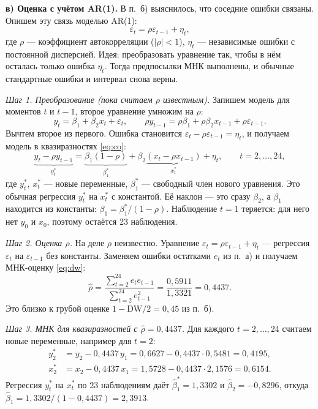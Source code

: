 \begin{solution}
\dwvisual

\medskip
\textbf{в) Оценка с учётом AR(1).} В п.~б) выяснилось, что соседние ошибки
связаны. Опишем эту связь моделью AR(1):
\[
  \varepsilon_t = \rho\varepsilon_{t-1} + \eta_t ,
\]
где $\rho$ — коэффициент автокорреляции ($|\rho| < 1$), $\eta_t$ —
независимые ошибки с постоянной дисперсией. Идея: преобразовать уравнение
так, чтобы в нём осталась только ошибка $\eta_t$. Тогда предпосылки МНК
выполнены, и обычные стандартные ошибки и интервал снова верны.

\smallskip
\emph{Шаг 1. Преобразование (пока считаем $\rho$ известным).} Запишем модель
для моментов $t$ и $t-1$, второе уравнение умножим на $\rho$:
\[
  y_t = \beta_1 + \beta_2x_t + \varepsilon_t ,
  \qquad
  \rho y_{t-1} = \rho\beta_1 + \rho\beta_2x_{t-1} + \rho\varepsilon_{t-1} .
\]
Вычтем второе из первого. Ошибка становится
$\varepsilon_t - \rho\varepsilon_{t-1} = \eta_t$, и получаем модель в
квазиразностях \eqref{eq:co}:
\[
  {\underbrace{y_t - \rho y_{t-1}}_{y_t^*}}
  = {\underbrace{\beta_1(1 - \rho)}_{\beta_1^*}}
  + \beta_2{\underbrace{(x_t - \rho x_{t-1})}_{x_t^*}} + \eta_t,
  \qquad t = 2, \dots, 24 ,
\]
где $y_t^*$, $x_t^*$ — новые переменные, $\beta_1^*$ — свободный член
нового уравнения. Это обычная регрессия $y_t^*$ на $x_t^*$ с константой.
Её наклон — это сразу $\beta_2$, а $\beta_1$ находится из константы:
$\beta_1 = \beta_1^*/(1 - \rho)$. Наблюдение $t = 1$ теряется: для него нет
$y_0$ и $x_0$, поэтому остаётся 23 наблюдения.

\smallskip
\emph{Шаг 2. Оценка $\rho$.} На деле $\rho$ неизвестно. Уравнение
$\varepsilon_t = \rho\varepsilon_{t-1} + \eta_t$ — регрессия $\varepsilon_t$
на $\varepsilon_{t-1}$ без константы. Заменяем ошибки остатками $e_t$ из
п.~а) и получаем МНК-оценку \eqref{eq:dw}:
\[
  \widehat\rho = \frac{\sum_{t=2}^{24} e_te_{t-1}}{\sum_{t=2}^{24} e_{t-1}^2}
  = \frac{0{,}5911}{1{,}3321} = 0{,}4437 .
\]
Это близко к грубой оценке $1 - \mathrm{DW}/2 = 0{,}45$ из п.~б).

\smallskip
\emph{Шаг 3. МНК для квазиразностей с $\widehat\rho = 0{,}4437$.} Для
каждого $t = 2, \dots, 24$ считаем новые переменные, например для $t = 2$:
\begin{align*}
  y_2^* &= y_2 - 0{,}4437\,y_1 = 0{,}6627 - 0{,}4437\cdot 0{,}5481 = 0{,}4195 ,\\
  x_2^* &= x_2 - 0{,}4437\,x_1 = 1{,}5728 - 0{,}4437\cdot 2{,}1576 = 0{,}6154 .
\end{align*}
Регрессия $y_t^*$ на $x_t^*$ по 23 наблюдениям даёт
$\widehat\beta_1^* = 1{,}3302$ и $\widehat\beta_2 = -0{,}8296$, откуда
$\widehat\beta_1 = 1{,}3302/(1 - 0{,}4437) = 2{,}3913$.


\end{solution}

